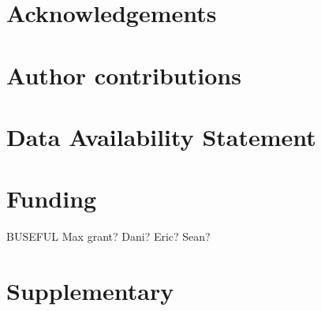 \documentclass[11pt]{article}
\begin{document}
\begin{spacing}{1.5}




\section{Acknowledgements}

\section{Author contributions}

\section{Data Availability Statement}

\section{Funding}
BUSEFUL
Max grant?
Dani? Eric? Sean? 

\end{spacing}

%


\clearpage

\appendix
\section{Supplementary}
\end{document}
